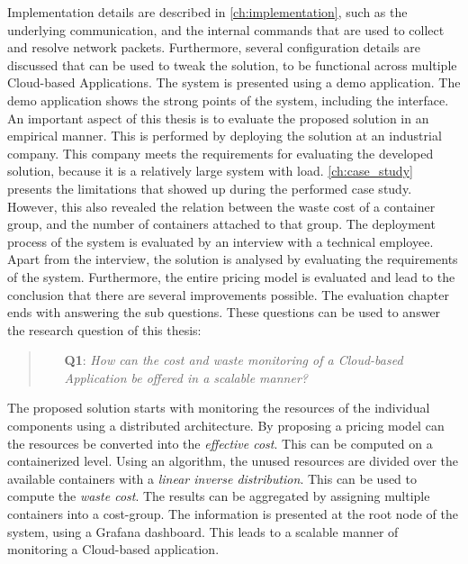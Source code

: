\noindent
Implementation details are described in \autoref{ch:implementation}, such as the underlying communication, and the internal commands that are used to collect and resolve network packets. Furthermore, several configuration details are discussed that can be used to tweak the solution, to be functional across multiple Cloud-based Applications. The system is presented using a demo application. The demo application shows the strong points of the system, including the interface.\\

\noindent
An important aspect of this thesis is to evaluate the proposed solution in an empirical manner. This is performed by deploying the solution at an industrial company. This company meets the requirements for evaluating the developed solution, because it is a relatively large system with load. \autoref{ch:case_study} presents the limitations that showed up during the performed case study. However, this also revealed the relation between the waste cost of a container group, and the number of containers attached to that group. The deployment process of the system is evaluated by an interview with a technical employee.\\

\noindent
Apart from the interview, the solution is analysed by evaluating the requirements of the system. Furthermore, the entire pricing model is evaluated and lead to the conclusion that there are several improvements possible. The evaluation chapter ends with answering the sub questions. These questions can be used to answer the research question of this thesis:

\begin{quote}
    \begin{itemize}
        \item[\textbf{Q1}: ]\textit{How can the cost and waste monitoring of a Cloud-based Application be offered in a scalable manner?}
    \end{itemize}
\end{quote}

\noindent
The proposed solution starts with monitoring the resources of the individual components using a distributed architecture. By proposing a pricing model can the resources be converted into the \textit{effective cost}. This can be computed on a containerized level. Using an algorithm, the unused resources are divided over the available containers with a \textit{linear inverse distribution}. This can be used to compute the \textit{waste cost}. The results can be aggregated by assigning multiple containers into a cost-group. The information is presented at the root node of the system, using a Grafana dashboard. This leads to a scalable manner of monitoring a Cloud-based application.

